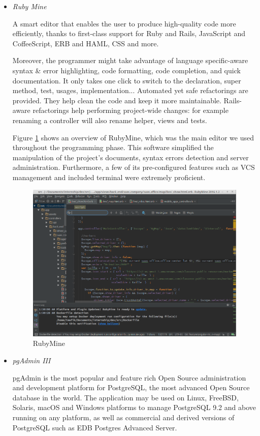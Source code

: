   
\begin{itemize}[label=]
  
\item\textit{Ruby Mine}

A smart editor that enables the user to produce high-quality code more efficiently, thanks to first-class support for Ruby and Rails, JavaScript and CoffeeScript, ERB and HAML, CSS and more.

Moreover, the programmer might take advantage of language specific-aware syntax \& error highlighting, code formatting, code completion, and quick documentation.
It only takes one click to switch to the declaration, super method, test, usages, implementation...
Automated yet safe refactorings are provided. They help clean the code and keep it more maintainable. Rails-aware refactorings help  performing project-wide changes: for example renaming a controller will also rename helper, views and tests. \cite{ruby}

Figure \ref{rubymine} shows an overview of RubyMine, which was the main editor we used throughout the programming phase. This software simplified the manipulation of the project's documents, syntax errors detection and server administration.
Furthermore, a few of its pre-configured features such as VCS management and included terminal were extremely proficient.

\begin{figure}[!htpb] 
\begin{center}
\includegraphics[width=6 in, height = 2 in]{images/rubymine.png}
\caption{RubyMine}
\label{rubymine}
\end{center}
\end{figure}



\item\textit{pgAdmin III}

pgAdmin is the most popular and feature rich Open Source administration and development platform for PostgreSQL, the most advanced Open Source database in the world. The application may be used on Linux, FreeBSD, Solaris, macOS and Windows platforms to manage PostgreSQL 9.2 and above running on any platform, as well as commercial and derived versions of PostgreSQL such as EDB Postgres Advanced Server.


\end{itemize}
